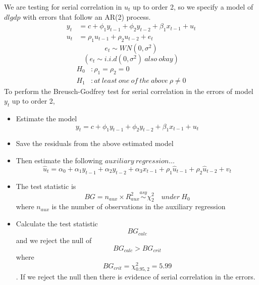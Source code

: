 \documentclass[12pt]{report}
\begin{document}
\noindent We are testing for serial correlation in $u_t$ up to order 2, so we specify a model of $dlgdp$ with errors that follow an AR(2) process.
\begin{align*}
y_t &= c + \phi_1 y_{t-1} + \phi_2 y_{t-2} + \beta_1 x_{t-1} + u_t \\
u_t &= \rho_1u_{t-1} + \rho_2u_{t-2} + e_t
\end{align*} $$e_t \sim WN(0,\sigma^2)$$ $$(e_t \sim i.i.d(0,\sigma^2)\ also\ okay)$$
\begin{align*}
H_0&: \rho_1 = \rho_2 = 0 \\
H_1&: at\ least\ one\ of\ the\ above\ \rho \neq 0
\end{align*}
To perform the Breusch-Godfrey test for serial correlation in the errors of model $y_t$ up to order 2,
\begin{itemize}
	\item Estimate the model $$y_t = c + \phi_1 y_{t-1} + \phi_2 y_{t-2} + \beta_1 x_{t-1} + u_t$$
	\item Save the residuals from the above estimated model 
	\item Then estimate the following $auxiliary\ regression \dots$ $$\hat{u}_t = \alpha_0 + \alpha_1y_{t-1} + \alpha_2y_{t-2} + \alpha_3x_{t-1} + \rho_1\hat{u}_{t-1} + \rho_2\hat{u}_{t-2} + v_t$$
	\item The test statistic is $$BG = n_{aux} \times R^2_{aux} \overset{asy}{\sim} \chi^2_2 \quad under\ H_0$$ where $n_{aux}$ is the number of observations in the auxiliary regression
	\item  Calculate the test statistic $$BG_{calc}$$ and we reject the null of $$BG_{calc} > BG_{crit}$$ where $$BG_{crit} = \chi^2_{0.95,2} = 5.99$$. If we reject the null then there is evidence of serial correlation in the errors.
\end{itemize}
\end{document}
